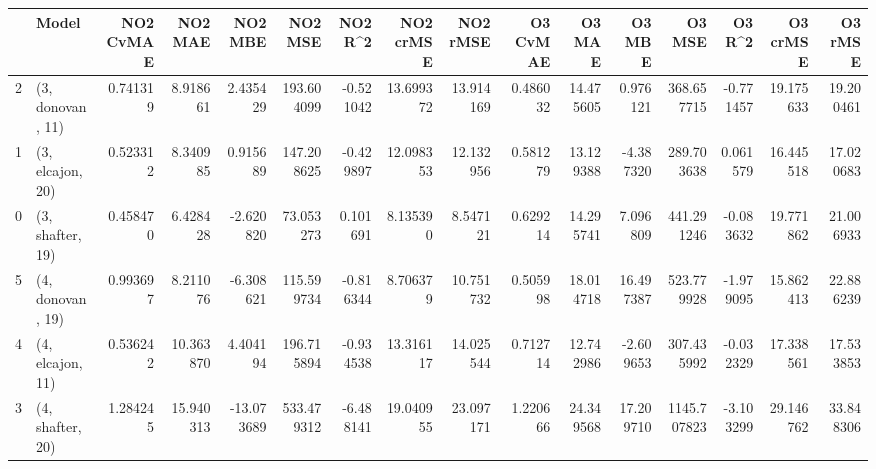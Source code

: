 \begin{tabular}{llrrrrrrrrrrrrrr}
\toprule
{} &             Model &  NO2 CvMAE &    NO2 MAE &    NO2 MBE &     NO2 MSE &   NO2 R\textasciicircum2 &  NO2 crMSE &   NO2 rMSE &  O3 CvMAE &     O3 MAE &     O3 MBE &       O3 MSE &    O3 R\textasciicircum2 &   O3 crMSE &    O3 rMSE \\
\midrule
2 &  (3, donovan, 11) &   0.741319 &   8.918661 &   2.435429 &  193.604099 & -0.521042 &  13.699372 &  13.914169 &  0.486032 &  14.475605 &   0.976121 &   368.657715 & -0.771457 &  19.175633 &  19.200461 \\
1 &  (3, elcajon, 20) &   0.523312 &   8.340985 &   0.915689 &  147.208625 & -0.429897 &  12.098353 &  12.132956 &  0.581279 &  13.129388 &  -4.387320 &   289.703638 &  0.061579 &  16.445518 &  17.020683 \\
0 &  (3, shafter, 19) &   0.458470 &   6.428428 &  -2.620820 &   73.053273 &  0.101691 &   8.135390 &   8.547121 &  0.629214 &  14.295741 &   7.096809 &   441.291246 & -0.083632 &  19.771862 &  21.006933 \\
5 &  (4, donovan, 19) &   0.993697 &   8.211076 &  -6.308621 &  115.599734 & -0.816344 &   8.706379 &  10.751732 &  0.505998 &  18.014718 &  16.497387 &   523.779928 & -1.979095 &  15.862413 &  22.886239 \\
4 &  (4, elcajon, 11) &   0.536242 &  10.363870 &   4.404194 &  196.715894 & -0.934538 &  13.316117 &  14.025544 &  0.712714 &  12.742986 &  -2.609653 &   307.435992 & -0.032329 &  17.338561 &  17.533853 \\
3 &  (4, shafter, 20) &   1.284245 &  15.940313 & -13.073689 &  533.479312 & -6.488141 &  19.040955 &  23.097171 &  1.220666 &  24.349568 &  17.209710 &  1145.707823 & -3.103299 &  29.146762 &  33.848306 \\
\bottomrule
\end{tabular}
